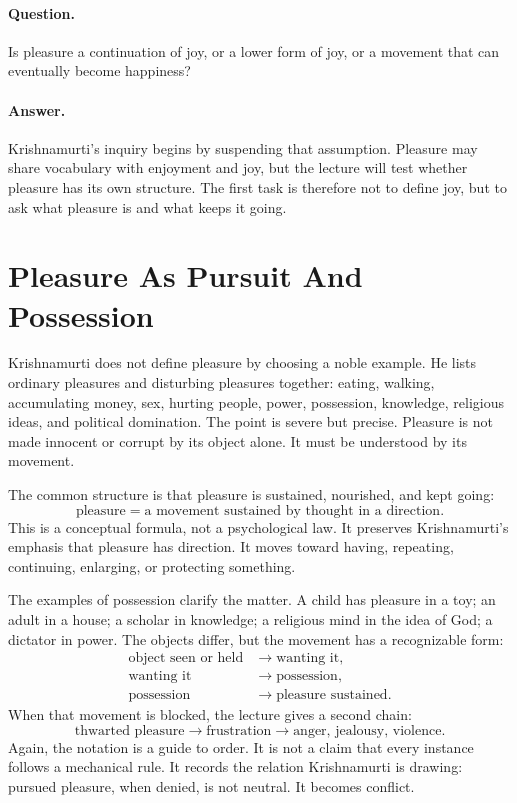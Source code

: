 \paragraph{Question.}
Is pleasure a continuation of joy, or a lower form of joy, or a movement that can eventually become happiness?

\paragraph{Answer.}
Krishnamurti's inquiry begins by suspending that assumption. Pleasure may share vocabulary with enjoyment and joy, but the lecture will test whether pleasure has its own structure. The first task is therefore not to define joy, but to ask what pleasure is and what keeps it going.

\section{Pleasure As Pursuit And Possession}

Krishnamurti does not define pleasure by choosing a noble example. He lists ordinary pleasures and disturbing pleasures together: eating, walking, accumulating money, sex, hurting people, power, possession, knowledge, religious ideas, and political domination. The point is severe but precise. Pleasure is not made innocent or corrupt by its object alone. It must be understood by its movement.

The common structure is that pleasure is sustained, nourished, and kept going:
\begin{equation}
\text{pleasure} = \text{a movement sustained by thought in a direction}.
\end{equation}
This is a conceptual formula, not a psychological law. It preserves Krishnamurti's emphasis that pleasure has direction. It moves toward having, repeating, continuing, enlarging, or protecting something.

The examples of possession clarify the matter. A child has pleasure in a toy; an adult in a house; a scholar in knowledge; a religious mind in the idea of God; a dictator in power. The objects differ, but the movement has a recognizable form:
\begin{align}
\text{object seen or held} &\longrightarrow \text{wanting it},\\
\text{wanting it} &\longrightarrow \text{possession},\\
\text{possession} &\longrightarrow \text{pleasure sustained}.
\end{align}
When that movement is blocked, the lecture gives a second chain:
\begin{equation}
\text{thwarted pleasure}
\longrightarrow
\text{frustration}
\longrightarrow
\text{anger, jealousy, violence}.
\end{equation}
Again, the notation is a guide to order. It is not a claim that every instance follows a mechanical rule. It records the relation Krishnamurti is drawing: pursued pleasure, when denied, is not neutral. It becomes conflict.

